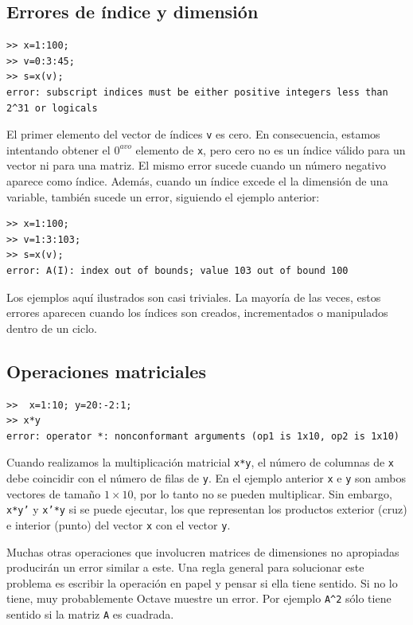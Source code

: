 \documentclass[letter,11pt]{article}
\newcommand\0{\mathbf{0}}
\newcommand{\octave}{{\sc Octave }}
\begin{document}
\subsection{Errores de \'indice y dimensi\'on}
\begin{lstlisting}
>> x=1:100;
>> v=0:3:45;
>> s=x(v);
error: subscript indices must be either positive integers less than 2^31 or logicals
\end{lstlisting}
El primer elemento del vector de \'indices \texttt{v} es cero. En consecuencia, estamos 
intentando obtener el $0^{avo}$ elemento de \texttt{x}, pero cero no es un \'indice v\'alido  para un vector ni para una matriz. El mismo error sucede cuando un n\'umero negativo aparece  como \'indice. Adem\'as, cuando un \'indice excede el la dimensi\'on de una variable,  tambi\'en sucede un error, siguiendo el ejemplo anterior:
\begin{lstlisting}
>> x=1:100;
>> v=1:3:103;
>> s=x(v);
error: A(I): index out of bounds; value 103 out of bound 100
\end{lstlisting}
Los ejemplos aqu\'i ilustrados son casi triviales. La mayor\'ia de las veces, estos errores aparecen cuando los \'indices son creados, incrementados o manipulados dentro de un ciclo.

\subsection{Operaciones matriciales}
\begin{lstlisting}
>>  x=1:10; y=20:-2:1;
>> x*y
error: operator *: nonconformant arguments (op1 is 1x10, op2 is 1x10)
\end{lstlisting}
Cuando realizamos la multiplicaci\'on matricial \texttt{x*y}, el n\'umero de columnas 
de \texttt{x} debe coincidir con el n\'umero de filas de \texttt{y}. En el ejemplo anterior 
\texttt{x} e \texttt{y} son ambos vectores de tama\~no $1\times 10$, por lo tanto 
no se pueden multiplicar. Sin embargo, \texttt{x*y'} y \texttt{x'*y} si se puede ejecutar, 
los que representan los productos exterior (cruz) e interior (punto) del vector \texttt{x} con el 
vector \texttt{y}.

Muchas otras operaciones que involucren matrices de dimensiones no apropiadas producir\'an un error
similar a este. Una regla general para solucionar este problema es escribir la operaci\'on en papel 
y pensar si ella tiene sentido. Si no lo tiene, muy probablemente \octave muestre un error.
Por ejemplo \texttt{A\^{}2} s\'olo tiene sentido si la matriz \texttt{A} es cuadrada.
\end{document}
